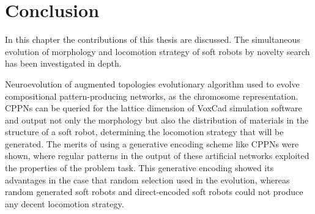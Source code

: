 

\chapter{Conclusion} %

\label{Conclusion} %


In this chapter the contributions of this thesis are discussed. The simultaneous evolution of morphology and locomotion strategy of soft robots by novelty search has been investigated in depth. 

Neuroevolution of augmented topologies evolutionary algorithm used to evolve compositional pattern-producing networks, as the chromosome representation. CPPNs can be queried for the lattice dimension of VoxCad simulation software and output not only the morphology but also the distribution of materials in the structure of a soft robot, determining the locomotion strategy that will be generated. The merits of using a generative encoding scheme like CPPNs were shown, where regular patterns in the output of these artificial networks exploited the properties of the problem task. This generative encoding showed its advantages in the case that random selection used in the evolution, whereas random generated soft robots and direct-encoded soft robots could not produce any decent locomotion strategy. 


